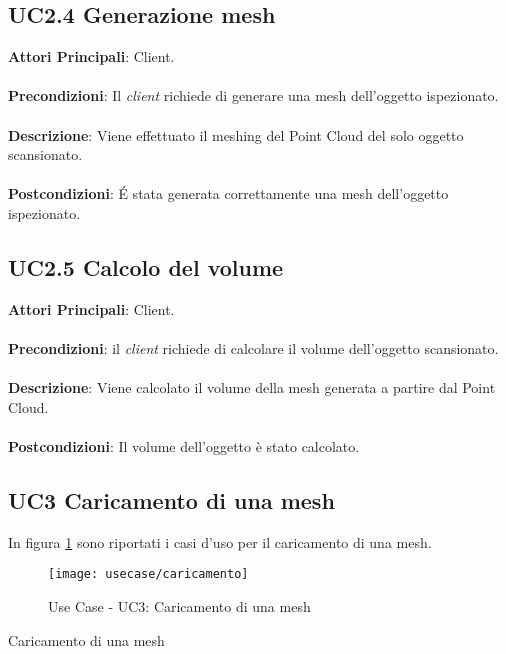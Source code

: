 \subsection{UC2.4 Generazione mesh}
\textbf{Attori Principali}: Client.
\\\\ \textbf{Precondizioni}: Il \emph{client} richiede di generare una mesh dell'oggetto ispezionato.
\\\\ \textbf{Descrizione}: Viene effettuato il meshing del Point Cloud del solo oggetto scansionato.
\\\\ \textbf{Postcondizioni}: \'E stata generata correttamente una mesh dell'oggetto ispezionato.

\subsection{UC2.5 Calcolo del volume}
\textbf{Attori Principali}: Client.
\\\\ \textbf{Precondizioni}: il \emph{client} richiede di calcolare il volume dell'oggetto scansionato.
\\\\ \textbf{Descrizione}: Viene calcolato il volume della mesh generata a partire dal Point Cloud.
\\\\ \textbf{Postcondizioni}: Il volume dell'oggetto è stato calcolato.

\newpage

\subsection{UC3 Caricamento di una mesh}
In figura \ref{fig:caricamento} sono riportati i casi d'uso per il caricamento di una mesh.
\begin{figure}[!h] 
    \centering 
    \texttt{[image: usecase/caricamento]} 
    \caption{Use Case - UC3: Caricamento di una mesh}
    \label{fig:caricamento}
\end{figure}

\begin{usecase}{3}{Caricamento di una mesh}
\\ 
\\ 
\\ 
\label{uc:caricamento}
\end{usecase}

